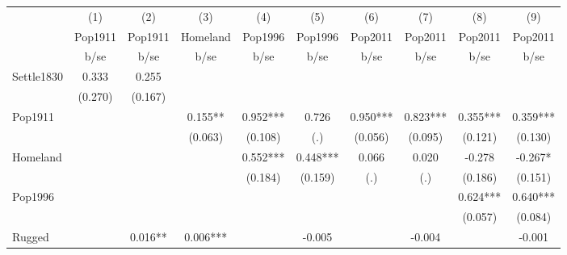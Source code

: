 {
\def\sym#1{\ifmmode^{#1}\else\(^{#1}\)\fi}
\begin{tabular}{l*{9}{c}}
\hline\hline
                    &\multicolumn{1}{c}{(1)}&\multicolumn{1}{c}{(2)}&\multicolumn{1}{c}{(3)}&\multicolumn{1}{c}{(4)}&\multicolumn{1}{c}{(5)}&\multicolumn{1}{c}{(6)}&\multicolumn{1}{c}{(7)}&\multicolumn{1}{c}{(8)}&\multicolumn{1}{c}{(9)}\\
                    &\multicolumn{1}{c}{Pop1911}&\multicolumn{1}{c}{Pop1911}&\multicolumn{1}{c}{Homeland}&\multicolumn{1}{c}{Pop1996}&\multicolumn{1}{c}{Pop1996}&\multicolumn{1}{c}{Pop2011}&\multicolumn{1}{c}{Pop2011}&\multicolumn{1}{c}{Pop2011}&\multicolumn{1}{c}{Pop2011}\\
                    &        b/se   &        b/se   &        b/se   &        b/se   &        b/se   &        b/se   &        b/se   &        b/se   &        b/se   \\
\hline
Settle1830          &       0.333   &       0.255   &               &               &               &               &               &               &               \\
                    &     (0.270)   &     (0.167)   &               &               &               &               &               &               &               \\
Pop1911             &               &               &       0.155** &       0.952***&       0.726   &       0.950***&       0.823***&       0.355***&       0.359***\\
                    &               &               &     (0.063)   &     (0.108)   &         (.)   &     (0.056)   &     (0.095)   &     (0.121)   &     (0.130)   \\
Homeland            &               &               &               &       0.552***&       0.448***&       0.066   &       0.020   &      -0.278   &      -0.267*  \\
                    &               &               &               &     (0.184)   &     (0.159)   &         (.)   &         (.)   &     (0.186)   &     (0.151)   \\
Pop1996             &               &               &               &               &               &               &               &       0.624***&       0.640***\\
                    &               &               &               &               &               &               &               &     (0.057)   &     (0.084)   \\
Rugged              &               &       0.016** &       0.006***&               &      -0.005   &               &      -0.004   &               &      -0.001   \\

\end{tabular}}
